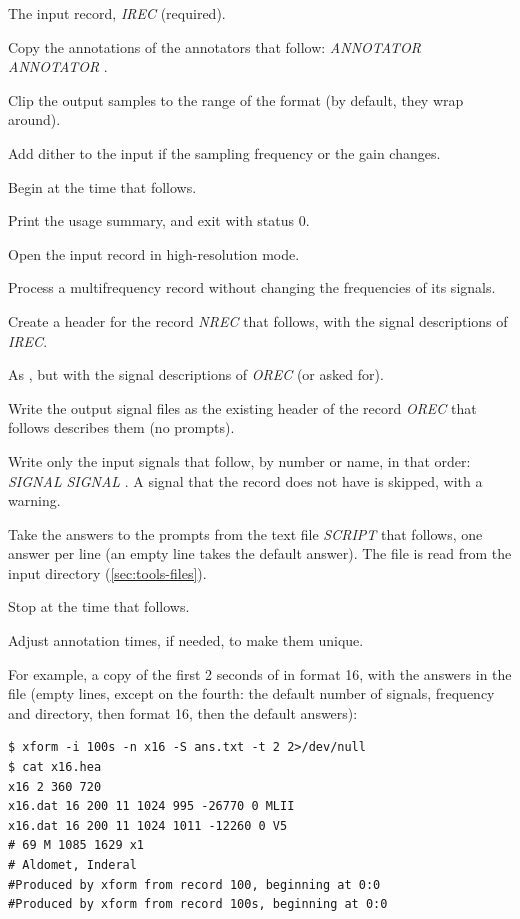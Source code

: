 \begin{params}
\item[-i] The input record, \textit{IREC} (required).
\item[-a] Copy the annotations of the annotators that follow:
   \textit{ANNOTATOR} \code{[}\textit{ANNOTATOR} \code{...]}.
\item[-c] Clip the output samples to the range of the format (by default, they wrap around).
\item[-d] Add dither to the input if the sampling frequency or the gain changes.
\item[-f] Begin at the time that follows.
\item[-h] Print the usage summary, and exit with status 0.
\item[-H] Open the input record in high-resolution mode.
\item[-M] Process a multifrequency record without changing the frequencies of its signals.
\item[-n] Create a header for the record \textit{NREC} that follows, with the signal
  descriptions of \textit{IREC}.
\item[-N] As , but with the signal descriptions of \textit{OREC} (or asked for).
\item[-o] Write the output signal files as the existing header of the record \textit{OREC}
  that follows describes them (no prompts).
\item[-s] Write only the input signals that follow, by number or name, in that order:
   \textit{SIGNAL} \code{[}\textit{SIGNAL} \code{...]}. A signal that the record does not
  have is skipped, with a warning.
\item[-S] Take the answers to the prompts from the text file \textit{SCRIPT} that follows,
  one answer per line (an empty line takes the default answer). The file is read from the
  input directory (\cref{sec:tools-files}).
\item[-t] Stop at the time that follows.
\item[-u] Adjust annotation times, if needed, to make them unique.
\end{params}
For example, a copy of the first 2 seconds of  in format 16, with the answers in
the file  (empty lines, except  on the fourth: the default number
of signals, frequency and directory, then format 16, then the default answers):
\begin{lstlisting}[style=text]
$ xform -i 100s -n x16 -S ans.txt -t 2 2>/dev/null
$ cat x16.hea
x16 2 360 720
x16.dat 16 200 11 1024 995 -26770 0 MLII
x16.dat 16 200 11 1024 1011 -12260 0 V5
# 69 M 1085 1629 x1
# Aldomet, Inderal
#Produced by xform from record 100, beginning at 0:0
#Produced by xform from record 100s, beginning at 0:0
\end{lstlisting}
